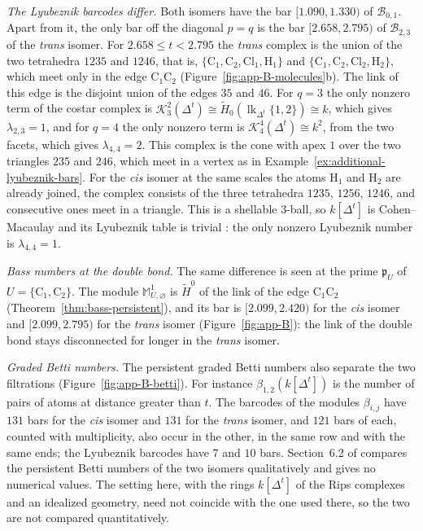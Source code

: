 \documentclass[11pt]{article}
\theoremstyle{plain}
\theoremstyle{definition}
\begin{document}
\emph{The Lyubeznik barcodes differ.} Both isomers have the bar $[1.090,1.330)$ of $\mathcal B_{0,1}$. Apart from it, the only bar off the diagonal $p=q$ is the bar $[2.658,2.795)$ of $\mathcal B_{2,3}$ of the \emph{trans} isomer. For $2.658\le t<2.795$ the \emph{trans} complex is the union of the two tetrahedra $1235$ and $1246$, that is, $\{\mathrm C_1,\mathrm C_2,\mathrm{Cl}_1,\mathrm H_1\}$ and $\{\mathrm C_1,\mathrm C_2,\mathrm{Cl}_2,\mathrm H_2\}$, which meet only in the edge $\mathrm C_1\mathrm C_2$ (Figure~\ref{fig:app-B-molecules}b). The link of this edge is the disjoint union of the edges $35$ and $46$. For $q=3$ the only nonzero term of the costar complex is $\mathcal K^2_3(\Delta^t)\cong\widetilde{H}_0(\operatorname{lk}_{\Delta^t}\{1,2\})\cong k$, which gives $\lambda_{2,3}=1$, and for $q=4$ the only nonzero term is $\mathcal K^4_4(\Delta^t)\cong k^2$, from the two facets, which gives $\lambda_{4,4}=2$. This complex is the cone with apex $1$ over the two triangles $235$ and $246$, which meet in a vertex as in Example~\ref{ex:additional-lyubeznik-bars}. For the \emph{cis} isomer at the same scales the atoms $\mathrm H_1$ and $\mathrm H_2$ are already joined, the complex consists of the three tetrahedra $1235$, $1256$, $1246$, and consecutive ones meet in a triangle. This is a shellable $3$-ball, so $k[\Delta^t]$ is Cohen--Macaulay \cite{BrunsHerzog} and its Lyubeznik table is trivial \cite{AlvarezMontanerYanagawa}: the only nonzero Lyubeznik number is $\lambda_{4,4}=1$.

\emph{Bass numbers at the double bond.} The same difference is seen at the prime $\mathfrak{p}_U$ of $U=\{\mathrm C_1,\mathrm C_2\}$. The module $\mathbb M^1_{U,\varnothing}$ is $\widetilde{H}^0$ of the link of the edge $\mathrm C_1\mathrm C_2$ (Theorem~\ref{thm:bass-persistent}), and its bar is $[2.099,2.420)$ for the \emph{cis} isomer and $[2.099,2.795)$ for the \emph{trans} isomer (Figure~\ref{fig:app-B}): the link of the double bond stays disconnected for longer in the \emph{trans} isomer.

\emph{Graded Betti numbers.} The persistent graded Betti numbers also separate the two filtrations (Figure~\ref{fig:app-B-betti}). For instance $\beta_{1,2}(k[\Delta^t])$ is the number of pairs of atoms at distance greater than $t$. The barcodes of the modules $\beta_{i,j}$ have $131$ bars for the \emph{cis} isomer and $131$ for the \emph{trans} isomer, and $121$ bars of each, counted with multiplicity, also occur in the other, in the same row and with the same ends; the Lyubeznik barcodes have $7$ and $10$ bars. Section~6.2 of \cite{SuwayyidWeiGraphs} compares the persistent Betti numbers of the two isomers qualitatively and gives no numerical values. The setting here, with the rings $k[\Delta^t]$ of the Rips complexes and an idealized geometry, need not coincide with the one used there, so the two are not compared quantitatively.
\end{document}
